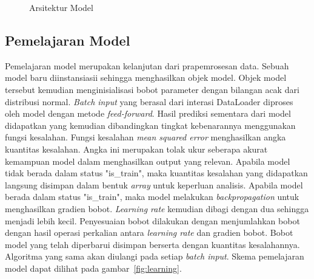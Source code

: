 \begin{figure}[htbp]
    \begin{center}
    \end{center}
    \vspace{-20pt}
    \captionsetup{labelfont=bf, textfont=bf}
    \caption{Arsitektur Model}
    \vspace{-10pt}
    \captionsetup{labelfont=md, textfont=md}
    \label{fig:arsitektur}
\end{figure}

\subsection{Pemelajaran Model}

Pemelajaran model merupakan kelanjutan dari prapemrosesan data. Sebuah model baru diinstansiasii
sehingga menghasilkan objek model. Objek model tersebut kemudian menginisialisasi bobot parameter
dengan bilangan acak dari distribusi normal. \textit{Batch input} yang berasal dari interasi DataLoader
diproses oleh model dengan metode \textit{feed-forward}. Hasil prediksi sementara dari model
didapatkan yang kemudian dibandingkan tingkat kebenarannya menggunakan fungsi kesalahan.
Fungsi kesalahan \textit{mean squared error} menghasilkan angka kuantitas kesalahan. Angka ini merupakan
tolak ukur seberapa akurat kemampuan model dalam menghasilkan output yang relevan. Apabila model tidak
berada dalam status "is\_train", maka kuantitas kesalahan yang didapatkan langsung disimpan dalam bentuk
\textit{array} untuk keperluan analisis. Apabila model berada dalam status "is\_train", maka model
melakukan \textit{backpropagation} untuk menghasilkan gradien bobot. \textit{Learning rate} kemudian
dibagi dengan dua sehingga menjadi lebih kecil. Penyesuaian bobot dilakukan dengan menjumlahkan bobot
dengan hasil operasi perkalian antara \textit{learning rate} dan gradien bobot. Bobot model yang telah
diperbarui disimpan berserta dengan kuantitas kesalahannya. Algoritma yang sama akan diulangi pada setiap \textit{batch input}.
Skema pemelajaran model dapat dilihat pada gambar~\ref{fig:learning}.

